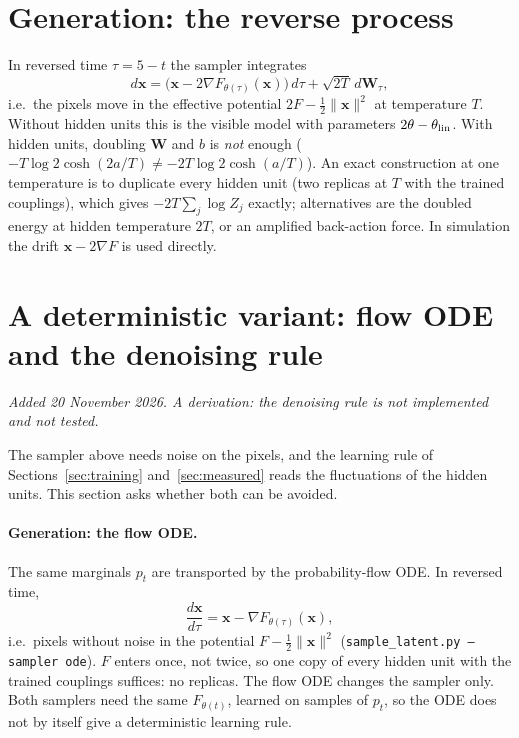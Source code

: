 \documentclass[11pt,a4paper]{article}
\newcommand{\vx}{\bm{x}}
\newcommand{\grad}{\nabla}
\begin{document}
\section{Generation: the reverse process}
In reversed time $\tau=5-t$ the sampler integrates
\begin{equation}
  d\vx=\big(\vx-2\grad F_{\theta(\tau)}(\vx)\big)\,d\tau+\sqrt{2T}\,d\bm W_\tau ,
\end{equation}
i.e.\ the pixels move in the effective potential $2F-\tfrac12\|\vx\|^2$ at temperature $T$. Without hidden units
this is the visible model with parameters $2\theta-\theta_{\rm lin}$. With hidden units, doubling $\bm W$ and $b$ is
\emph{not} enough ($-T\log2\cosh(2a/T)\ne-2T\log2\cosh(a/T)$). An exact construction at one temperature is to
duplicate every hidden unit (two replicas at $T$ with the trained couplings), which gives $-2T\sum_j\log Z_j$
exactly; alternatives are the doubled energy at hidden temperature $2T$, or an amplified back-action force. In
simulation the drift $\vx-2\grad F$ is used directly.

\section{A deterministic variant: flow ODE and the denoising rule}\label{sec:det}
\emph{Added 20 November 2026. A derivation: the denoising rule is not implemented and not tested.}

The sampler above needs noise on the pixels, and the learning rule of
Sections~\ref{sec:training} and~\ref{sec:measured} reads the fluctuations of the hidden units. This section asks
whether both can be avoided.

\paragraph{Generation: the flow ODE.} The same marginals $p_t$ are transported by the probability-flow ODE. In
reversed time,
\begin{equation}
  \frac{d\vx}{d\tau}=\vx-\grad F_{\theta(\tau)}(\vx),
\end{equation}
i.e.\ pixels without noise in the potential $F-\tfrac12\|\vx\|^2$ (\texttt{sample\_latent.py --sampler ode}). $F$
enters once, not twice, so one copy of every hidden unit with the trained couplings suffices: no replicas. The
flow ODE changes the sampler only. Both samplers need the same $F_{\theta(t)}$, learned on samples of $p_t$, so the
ODE does not by itself give a deterministic learning rule.
\end{document}
